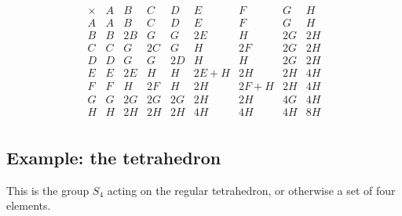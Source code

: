 \documentclass[11pt,oneside]{article}
\newcommand{\thinplus}{\!+\!}
\begin{document}
{\small
$$
\begin{array}{r|rrrrrrrr}
\times & A & B & C & D & E & F & G & H \\
\hline
A & A & B & C & D & E & F & G & H \\
B & B & 2B & G & G & 2E & H & 2G & 2H \\
C & C & G & 2C & G & H & 2F & 2G & 2H \\
D & D & G & G & 2D & H & H & 2G & 2H \\
E & E & 2E & H & H & 2E\thinplus H & 2H & 2H & 4H \\
F & F & H & 2F & H & 2H & 2F\thinplus H & 2H & 4H \\
G & G & 2G & 2G & 2G & 2H & 2H & 4G & 4H \\
H & H & 2H & 2H & 2H & 4H & 4H & 4H & 8H \\
\end{array}
$$
}


\subsection{Example: the tetrahedron}

This is the group $S_4$ acting on the regular tetrahedron,
or otherwise a set of four elements.

\end{document}
